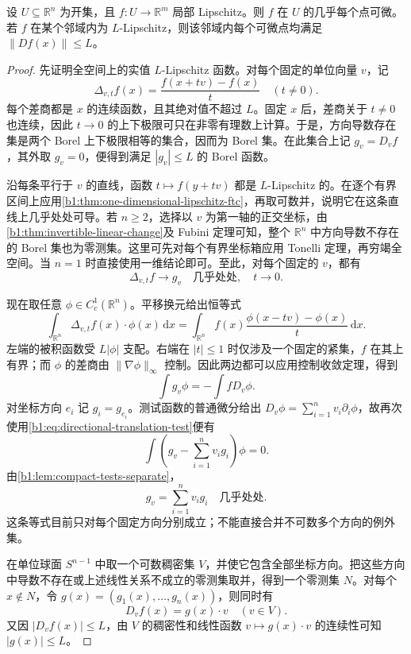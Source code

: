 \begin{theorem}[Rademacher]\label{b1:thm:rademacher}
设 \(U\subseteq\mathbb R^n\) 为开集，且 \(f:U\rightarrow\mathbb R^m\) 局部 Lipschitz。则 \(f\) 在 \(U\) 的几乎每个点可微。若 \(f\) 在某个邻域内为 \(L\)-Lipschitz，则该邻域内每个可微点均满足 \(\|Df(x)\|\leq L\)。
\end{theorem}
\begin{proof}
先证明全空间上的实值 \(L\)-Lipschitz 函数。对每个固定的单位向量 \(v\)，记
\[
 \Delta_{v,t}f(x)=\frac{f(x+tv)-f(x)}t\quad(t\ne0).
\]
每个差商都是 \(x\) 的连续函数，且其绝对值不超过 \(L\)。固定 \(x\) 后，差商关于 \(t\ne0\) 也连续，因此 \(t\to0\) 的上下极限可只在非零有理数上计算。于是，方向导数存在集是两个 Borel 上下极限相等的集合，因而为 Borel 集。在此集合上记 \(g_v=D_vf\)，其外取 \(g_v=0\)，便得到满足 \(|g_v|\leq L\) 的 Borel 函数。

沿每条平行于 \(v\) 的直线，函数 \(t\mapsto f(y+tv)\) 都是 \(L\)-Lipschitz 的。在逐个有界区间上应用\cref{b1:thm:one-dimensional-lipschitz-ftc}，再取可数并，说明它在这条直线上几乎处处可导。若 \(n\geq2\)，选择以 \(v\) 为第一轴的正交坐标，由\cref{b1:thm:invertible-linear-change}及 Fubini 定理可知，整个 \(\mathbb R^n\) 中方向导数不存在的 Borel 集也为零测集。这里可先对每个有界坐标箱应用 Tonelli 定理，再穷竭全空间。当 \(n=1\) 时直接使用一维结论即可。至此，对每个固定的 \(v\)，都有
\[
 \Delta_{v,t}f\longrightarrow g_v
 \quad\text{几乎处处},\quad t\to0.
\]

现在取任意 \(\phi\in C_c^1(\mathbb R^n)\)。平移换元给出恒等式
\[
 \int_{\mathbb R^n}\Delta_{v,t}f(x)\cdot\phi(x)\,\mathrm dx
 =
 \int_{\mathbb R^n}f(x)
             \frac{\phi(x-tv)-\phi(x)}t\,\mathrm dx.
\]
左端的被积函数受 \(L|\phi|\) 支配。右端在 \(|t|\leq1\) 时仅涉及一个固定的紧集，\(f\) 在其上有界；而 \(\phi\) 的差商由 \(\|\nabla\phi\|_\infty\) 控制。因此两边都可以应用控制收敛定理，得到
\begin{equation}\label{b1:eq:directional-translation-test}
 \int g_v\phi=-\int fD_v\phi.
\end{equation}
对坐标方向 \(e_i\) 记 \(g_i=g_{e_i}\)。测试函数的普通微分给出 \(D_v\phi=\sum_{i=1}^n v_i\partial_i\phi\)，故再次使用\eqref{b1:eq:directional-translation-test}便有
\[
 \int\left(g_v-\sum_{i=1}^n v_ig_i\right)\phi=0.
\]
由\cref{b1:lem:compact-tests-separate}，
\[
 g_v=\sum_{i=1}^n v_ig_i
 \quad\text{几乎处处}.
\]
这条等式目前只对每个固定方向分别成立；不能直接合并不可数多个方向的例外集。

在单位球面 \(S^{n-1}\) 中取一个可数稠密集 \(V\)，并使它包含全部坐标方向。把这些方向中导数不存在或上述线性关系不成立的零测集取并，得到一个零测集 \(N\)。对每个 \(x\notin N\)，令 \(g(x)=(g_1(x),\ldots,g_n(x))\)，则同时有
\[
 D_vf(x)=g(x)\cdot v\quad(v\in V).
\]
又因 \(|D_vf(x)|\leq L\)，由 \(V\) 的稠密性和线性函数 \(v\mapsto g(x)\cdot v\) 的连续性可知 \(|g(x)|\leq L\)。


\end{proof}
